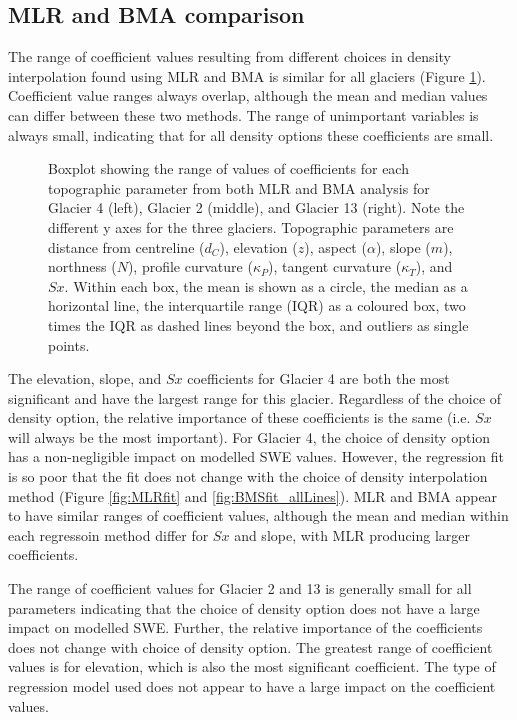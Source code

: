 \documentclass[12pt]{article}
\newcommand{\params}{Topographic parameters are distance from centreline ($d_C$), elevation ($z$), aspect ($\alpha$), slope ($m$), northness ($N$), profile curvature ($\kappa_P$), tangent curvature ($\kappa_T$), and $Sx$. }
\newcommand{\boxplot}{Within each box, the mean is shown as a circle, the median as a horizontal line, the interquartile range (IQR) as a coloured box, two times the IQR as dashed lines beyond the box, and outliers as single points. }
\begin{document}
\subsection{MLR and BMA comparison}

The range of coefficient values resulting from different choices in density interpolation found using MLR and BMA is similar for all glaciers (Figure \ref{fig:allCeoffs_boxplot}). Coefficient value ranges always overlap, although the mean and median values can differ between these two methods. The range of unimportant variables is always small, indicating that for all density options these coefficients are small. 

\begin{figure}[H]
	\caption{Boxplot showing the range of values of coefficients for each topographic parameter from both MLR and BMA analysis for Glacier 4 (left), Glacier 2 (middle), and Glacier 13 (right). Note the different y axes for the three glaciers. \params \boxplot}
	\label{fig:allCeoffs_boxplot}
\end{figure}

The elevation, slope, and $Sx$ coefficients for Glacier 4 are both the most significant and have the largest range for this glacier. Regardless of the choice of density option, the relative importance of these coefficients is the same (i.e. $Sx$ will always be the most important). For Glacier 4, the choice of density option has a non-negligible impact on modelled SWE values. However, the regression fit is so poor that the fit does not change with the choice of density interpolation method (Figure \ref{fig:MLRfit} and \ref{fig:BMSfit_allLines}). MLR and BMA appear to have similar ranges of coefficient values, although the mean and median within each regressoin method differ for $Sx$ and slope, with MLR producing larger coefficients.

The range of coefficient values for Glacier 2 and 13 is generally small for all parameters indicating that the choice of density option does not have a large impact on modelled SWE. Further, the relative importance of the coefficients does not change with choice of density option. The greatest range of coefficient values is for elevation, which is also the most significant coefficient. The type of regression model used does not appear to have a large impact on the coefficient values.
\end{document}
